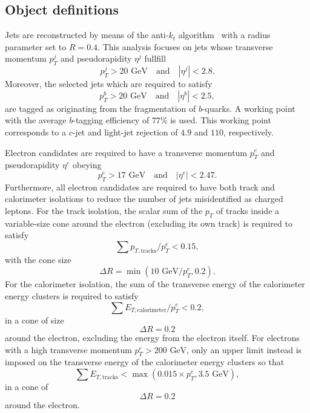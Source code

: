 \documentclass{ws-mpla}
\begin{document}
\subsection{Object definitions}

Jets are reconstructed by means of the anti-$k_t$ algorithm~\cite{Cacciari:2008gp} with a radius parameter set to $R=0.4$. This analysis focuses on jets whose transverse momentum $p^j_T$ and pseudorapidity $\eta^j$ fullfill
\begin{equation}
p^j_T > 20\textrm{ GeV}\quad \textrm{and}\quad |\eta^j| < 2.8.
\end{equation} 
Moreover, {\color{blue}the selected jets which are required to satisfy 
\begin{equation}
p^b_T > 20 \textrm{ GeV}\quad \textrm{and}\quad |\eta^b| < 2.5,
\end{equation}
are tagged as originating from the fragmentation of $b$-quarks.}
A working point with the average $b$-tagging efficiency of $77\%$ is used. This working point corresponds to a $c$-jet and light-jet rejection of $4.9$ and $110$, respectively.

Electron candidates are required to have a transverse momentum $p^e_T$ and pseudorapidity $\eta^e$ obeying
\begin{equation}
p^e_T > 17 \textrm{ GeV}\quad \textrm{and}\quad |\eta^e| < 2.47.
\end{equation}
Furthermore, all electron candidates are required to have both track and calorimeter isolations
to reduce the number of jets misidentified as charged leptons.
For the track isolation, the scalar sum of the $p_T$ of tracks inside a variable-size cone around the electron (excluding its own track) is required to satisfy
\begin{equation}
\sum p_{T,\textrm{tracks}}/p^e_T < 0.15 ,
\end{equation}
with the cone size
\begin{equation}
\Delta R=\min(10\textrm{ GeV}/p^e_T,0.2) .
\end{equation}
For the calorimeter isolation,
the sum of the transverse energy of the calorimeter energy clusters is required to satisfy
\begin{equation}
\sum E_{T,\textrm{calorimeter}}/p^e_T < 0.2 ,
\end{equation}
in a cone of size
\begin{equation}
\Delta R=0.2
\end{equation}
around the electron, excluding the energy from the electron itself.
For electrons with a high transverse momentum
$ p^e_T > 200\textrm{ GeV} $,
only an upper limit instead is imposed on the transverse energy of the calorimeter energy clusters so that
\begin{equation}
\sum E_{T,\textrm{tracks}} < \max(0.015\times p^e_T,3.5\textrm{ GeV}) ,
\end{equation}
in a cone of
\begin{equation}
\Delta R=0.2
\end{equation}
around the electron.
\end{document}
